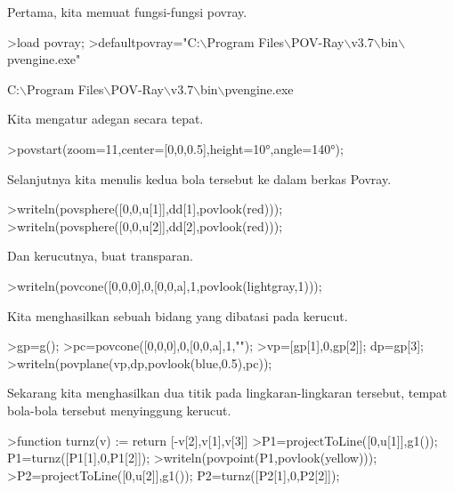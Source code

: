 \documentclass{article}
\newenvironment{eulernotebook}{\par}{\par}
\newenvironment{eulercomment}{\par\medskip}{\par\medskip}
\begin{document}
\begin{eulernotebook}
\begin{eulercomment}
\begin{eulercomment}
\begin{eulercomment}
\begin{eulercomment}
\begin{eulercomment}
Pertama, kita memuat fungsi-fungsi povray.
\end{eulercomment}
\begin{eulerprompt}
>load povray;
>defaultpovray="C:\(\backslash\)Program Files\(\backslash\)POV-Ray\(\backslash\)v3.7\(\backslash\)bin\(\backslash\)pvengine.exe"
\end{eulerprompt}
\begin{euleroutput}
  C:\(\backslash\)Program Files\(\backslash\)POV-Ray\(\backslash\)v3.7\(\backslash\)bin\(\backslash\)pvengine.exe
\end{euleroutput}
\begin{eulercomment}
Kita mengatur adegan secara tepat.
\end{eulercomment}
\begin{eulerprompt}
>povstart(zoom=11,center=[0,0,0.5],height=10°,angle=140°);
\end{eulerprompt}
\begin{eulercomment}
Selanjutnya kita menulis kedua bola tersebut ke dalam berkas Povray.
\end{eulercomment}
\begin{eulerprompt}
>writeln(povsphere([0,0,u[1]],dd[1],povlook(red)));
>writeln(povsphere([0,0,u[2]],dd[2],povlook(red)));
\end{eulerprompt}
\begin{eulercomment}
Dan kerucutnya, buat transparan.
\end{eulercomment}
\begin{eulerprompt}
>writeln(povcone([0,0,0],0,[0,0,a],1,povlook(lightgray,1)));
\end{eulerprompt}
\begin{eulercomment}
Kita menghasilkan sebuah bidang yang dibatasi pada kerucut.
\end{eulercomment}
\begin{eulerprompt}
>gp=g();
>pc=povcone([0,0,0],0,[0,0,a],1,"");
>vp=[gp[1],0,gp[2]]; dp=gp[3];
>writeln(povplane(vp,dp,povlook(blue,0.5),pc));
\end{eulerprompt}
\begin{eulercomment}
Sekarang kita menghasilkan dua titik pada lingkaran-lingkaran
tersebut, tempat bola-bola tersebut menyinggung kerucut.
\end{eulercomment}
\begin{eulerprompt}
>function turnz(v) := return [-v[2],v[1],v[3]]
>P1=projectToLine([0,u[1]],g1()); P1=turnz([P1[1],0,P1[2]]);
>writeln(povpoint(P1,povlook(yellow)));
>P2=projectToLine([0,u[2]],g1()); P2=turnz([P2[1],0,P2[2]]);

\end{eulerprompt}
\end{eulercomment}
\end{eulercomment}
\end{eulercomment}
\end{eulercomment}
\end{eulernotebook}
\end{document}
